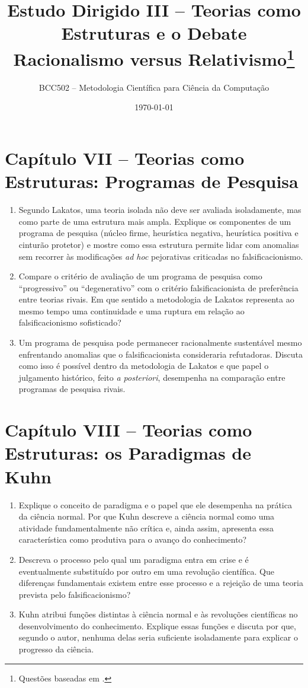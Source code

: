 \documentclass[10pt,a4paper]{extarticle}
\title{Estudo Dirigido III -- Teorias como Estruturas e o Debate Racionalismo versus Relativismo\footnote{Questões baseadas em \citep{chalmers1993}.}}
\author{BCC502 -- Metodologia Científica para Ciência da Computação}
\date{\today}
\begin{document}
\vspace{-1cm}
\maketitle

\section*{Capítulo VII -- Teorias como Estruturas: Programas de Pesquisa}
\begin{enumerate}[label=\textbf{\arabic*.}, itemsep=10pt]
  \item Segundo Lakatos, uma teoria isolada não deve ser avaliada isoladamente, mas como parte de uma estrutura mais ampla. Explique os componentes de um programa de pesquisa (núcleo firme, heurística negativa, heurística positiva e cinturão protetor) e mostre como essa estrutura permite lidar com anomalias sem recorrer às modificações \emph{ad hoc} pejorativas criticadas no falsificacionismo.
  \item Compare o critério de avaliação de um programa de pesquisa como \enquote{progressivo} ou \enquote{degenerativo} com o critério falsificacionista de preferência entre teorias rivais. Em que sentido a metodologia de Lakatos representa ao mesmo tempo uma continuidade e uma ruptura em relação ao falsificacionismo sofisticado?
  \item Um programa de pesquisa pode permanecer racionalmente sustentável mesmo enfrentando anomalias que o falsificacionista consideraria refutadoras. Discuta como isso é possível dentro da metodologia de Lakatos e que papel o julgamento histórico, feito \emph{a posteriori}, desempenha na comparação entre programas de pesquisa rivais.
\end{enumerate}

\section*{Capítulo VIII -- Teorias como Estruturas: os Paradigmas de Kuhn}
\begin{enumerate}[resume, label=\textbf{\arabic*.}, itemsep=10pt]
  \item Explique o conceito de paradigma e o papel que ele desempenha na prática da ciência normal. Por que Kuhn descreve a ciência normal como uma atividade fundamentalmente não crítica e, ainda assim, apresenta essa característica como produtiva para o avanço do conhecimento?
  \item Descreva o processo pelo qual um paradigma entra em crise e é eventualmente substituído por outro em uma revolução científica. Que diferenças fundamentais existem entre esse processo e a rejeição de uma teoria prevista pelo falsificacionismo?
  \item Kuhn atribui funções distintas à ciência normal e às revoluções científicas no desenvolvimento do conhecimento. Explique essas funções e discuta por que, segundo o autor, nenhuma delas seria suficiente isoladamente para explicar o progresso da ciência.
\end{enumerate}
\end{document}
